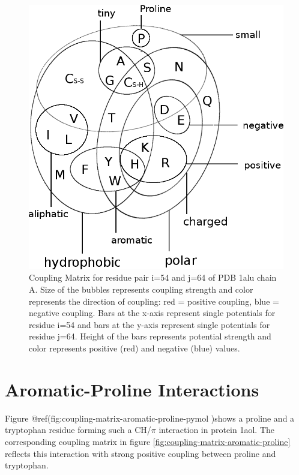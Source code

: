 \documentclass[12pt,a4paper,twoside]{book}
\theoremstyle{definition}
\theoremstyle{definition}
\theoremstyle{remark}
\begin{document}
\begin{figure}
\includegraphics[width=1\linewidth]{img/amino_acid_physico_chemical_properties_venn_diagramm} \caption{Coupling Matrix for
residue pair i=54 and j=64 of PDB 1alu chain A. Size of the bubbles
represents coupling strength and color represents the direction of
coupling: red = positive coupling, blue = negative coupling. Bars at the
x-axis represent single potentials for residue i=54 and bars at the
y-axis represent single potentials for residue j=64. Height of the bars
represents potential strength and color represents positive (red) and
negative (blue) values.}\label{fig:coupling-matrix-disulfide-interaction}
\end{figure}

\section{Aromatic-Proline Interactions}\label{aromatic-proline}

Figure @ref(fig:coupling-matrix-aromatic-proline-pymol )shows a proline
and a tryptophan residue forming such a CH/\(\pi\) interaction in
protein 1aol. The corresponding coupling matrix in figure
\ref{fig:coupling-matrix-aromatic-proline} reflects this interaction
with strong positive coupling between proline and tryptophan.
\end{document}
